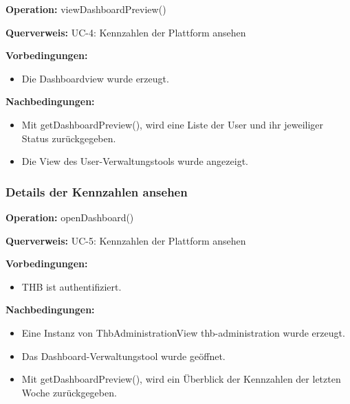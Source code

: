 \documentclass[a4paper,12pt]{article}
\begin{document}
	\begin{contractbox}
		\textbf{Operation:} viewDashboardPreview()
		
			\textbf{Querverweis:} UC-4: Kennzahlen der Plattform ansehen
		
		\textbf{Vorbedingungen:}
		\begin{itemize}[noitemsep]
			\item Die Dashboardview wurde erzeugt.
		\end{itemize}
		
		\textbf{Nachbedingungen:}
		\begin{itemize}[noitemsep]
			\item Mit getDashboardPreview(), wird eine Liste der User und ihr jeweiliger Status zurückgegeben.
			\item Die View des User-Verwaltungstools wurde angezeigt.
		\end{itemize}
	\end{contractbox}

	\subsubsection{Details der Kennzahlen ansehen}
	\begin{contractbox}
		\textbf{Operation:} openDashboard()
		
			\textbf{Querverweis:} UC-5: Kennzahlen der Plattform ansehen
		
		\textbf{Vorbedingungen:}
		\begin{itemize}[noitemsep]
			\item THB ist authentifiziert.
		\end{itemize}
		
		\textbf{Nachbedingungen:}
		\begin{itemize}[noitemsep]
			\item Eine Instanz von ThbAdministrationView thb-administration wurde erzeugt.
			\item Das Dashboard-Verwaltungstool wurde geöffnet.
			\item Mit getDashboardPreview(), wird ein Überblick der Kennzahlen der letzten Woche zurückgegeben.
		\end{itemize}
	\end{contractbox}
\end{document}
